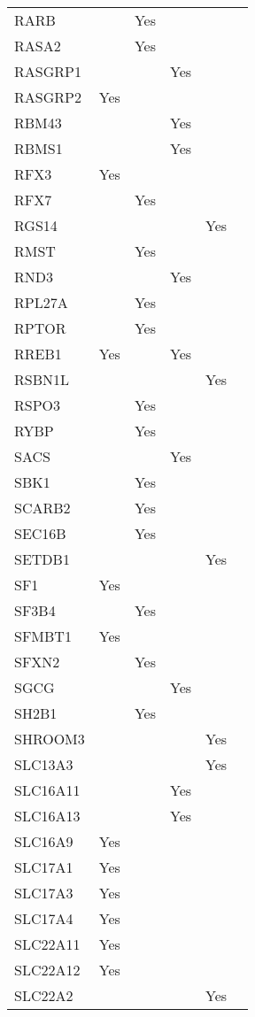 \documentclass[]{report}
\begin{document}
\begin{appendices}
\begin{longtable}[t]{llllll}
RARB &  & Yes &  &  & \\
RASA2 &  & Yes &  &  & \\
RASGRP1 &  &  & Yes &  & \\
RASGRP2 & Yes &  &  &  & \\
RBM43 &  &  & Yes &  & \\
RBMS1 &  &  & Yes &  & \\
RFX3 & Yes &  &  &  & \\
RFX7 &  & Yes &  &  & \\
RGS14 &  &  &  & Yes & \\
RMST &  & Yes &  &  & \\
RND3 &  &  & Yes &  & \\
RPL27A &  & Yes &  &  & \\
RPTOR &  & Yes &  &  & \\
RREB1 & Yes &  & Yes &  & \\
RSBN1L &  &  &  & Yes & \\
RSPO3 &  & Yes &  &  & \\
RYBP &  & Yes &  &  & \\
SACS &  &  & Yes &  & \\
SBK1 &  & Yes &  &  & \\
SCARB2 &  & Yes &  &  & \\
SEC16B &  & Yes &  &  & \\
SETDB1 &  &  &  & Yes & \\
SF1 & Yes &  &  &  & \\
SF3B4 &  & Yes &  &  & \\
SFMBT1 & Yes &  &  &  & \\
SFXN2 &  & Yes &  &  & \\
SGCG &  &  & Yes &  & \\
SH2B1 &  & Yes &  &  & \\
SHROOM3 &  &  &  & Yes & \\
SLC13A3 &  &  &  & Yes & \\
SLC16A11 &  &  & Yes &  & \\
SLC16A13 &  &  & Yes &  & \\
SLC16A9 & Yes &  &  &  & \\
SLC17A1 & Yes &  &  &  & \\
SLC17A3 & Yes &  &  &  & \\
SLC17A4 & Yes &  &  &  & \\
SLC22A11 & Yes &  &  &  & \\
SLC22A12 & Yes &  &  &  & \\
SLC22A2 &  &  &  & Yes & \\

\end{longtable}
\end{appendices}
\end{document}
